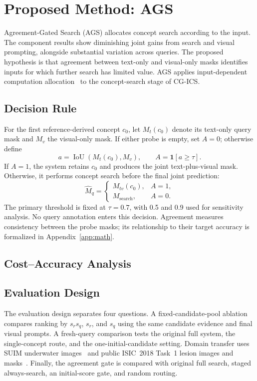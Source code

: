 \section{Proposed Method: AGS}
\label{sec:extension}
Agreement-Gated Search (AGS) allocates concept search according to the input. The component results show diminishing joint gains from search and visual prompting, alongside substantial variation across queries. The proposed hypothesis is that agreement between text-only and visual-only masks identifies inputs for which further search has limited value. AGS applies input-dependent computation allocation~\cite{branchynet,adaptiveinference} to the concept-search stage of CG-ICS.

\subsection{Decision Rule}
For the first reference-derived concept $c_0$, let $M_t(c_0)$ denote its text-only query mask and $M_v$ the visual-only mask. If either probe is empty, set $A=0$; otherwise define
\begin{equation}
    a=\operatorname{IoU}\!\left(M_t(c_0),M_v\right),\qquad
    A=\mathbf{1}\!\left[a\geq\tau\right].
\end{equation}
If $A=1$, the system retains $c_0$ and produces the joint text-plus-visual mask. Otherwise, it performs concept search before the final joint prediction:
\begin{equation}
    \widehat M_q=
    \begin{cases}
        M_{tv}(c_0), & A=1,\\
        M_{\mathrm{search}}, & A=0.
    \end{cases}
    \label{eq:gate}
\end{equation}
The primary threshold is fixed at $\tau=0.7$, with 0.5 and 0.9 used for sensitivity analysis. No query annotation enters this decision. Agreement measures consistency between the probe masks; its relationship to their target accuracy is formalized in Appendix~\ref{app:math}.

\subsection{Cost--Accuracy Analysis}


\subsection{Evaluation Design}
The evaluation design separates four questions. A fixed-candidate-pool ablation compares ranking by $s_rs_q$, $s_r$, and $s_q$ using the same candidate evidence and final visual prompts. A fresh-query comparison tests the original full system, the single-concept route, and the one-initial-candidate setting. Domain transfer uses SUIM underwater images~\cite{suim} and public ISIC~2018 Task~1 lesion images and masks~\cite{isic,ham10000}. Finally, the agreement gate is compared with original full search, staged always-search, an initial-score gate, and random routing.

